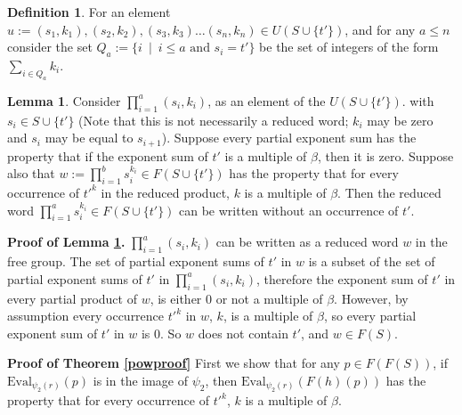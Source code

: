 \documentclass[12pt]{article} %
\theoremstyle{definition}
\theoremstyle{definition}
\theoremstyle{definition}
\theoremstyle{definition}
\newtheorem{sublemma}{Lemma}[theorem]
\theoremstyle{definition}
\newtheorem{defn}[theorem]{Definition}
\theoremstyle{definition}
\begin{document}
\begin{defn}
  For an element $u := (s_1, k_1), (s_2, k_2), (s_3, k_3) \dots (s_n, k_n) \in U(S \cup \{t'\})$,
  and for any $a \le n$
  consider the set $Q_a := \{ i \ \mid \ i \le a \text{ and } s_i = t' \}$
  be the set of integers of the form $\sum_{i \in Q_a} k_i$.
\end{defn}

\begin{sublemma}\label{powproof1}
  Consider $\prod_{i = 1}^a (s_i, k_i)$, as an element of the $U(S \cup \{t' \})$.
  with $s_i \in S \cup \{t'\}$ (Note that this is not necessarily a reduced
  word; $k_i$ may be zero and $s_i$ may be equal to $s_{i+1}$).
  Suppose every partial exponent sum has the property that if the exponent sum of
  $t'$ is a multiple of $\beta$, then it is zero. Suppose also that
  $w := \prod_{i = 1}^b s_i^{k_i} \in F(S \cup \{t'\})$ has the
  property that for every occurrence of $t'^k$ in the reduced product,
  $k$ is a multiple of $\beta$. Then the reduced word
  $\prod_{i = 1}^a s_i^{k_i} \in F(S \cup \{t'\})$
  can be written without an occurrence of $t'$.
\end{sublemma}

\textbf{Proof of Lemma \ref{powproof1}.}
$\prod_{i = 1}^a (s_i, k_i)$ can be written as a reduced word $w$ in the free group.
The set of partial exponent sums of $t'$ in $w$
is a subset of the set of partial exponent sums of $t'$ in $\prod_{i = 1}^a (s_i, k_i)$,
therefore the exponent sum of $t'$ in every partial product of $w$, is
either $0$ or not a multiple of $\beta$.
However, by assumption every occurrence $t'^k$ in $w$, $k$,
is a multiple of $\beta$, so every partial exponent sum of $t'$ in $w$ is $0$.
So $w$ does not contain $t'$, and $w \in F(S)$.



\textbf{Proof of Theorem \ref{powproof}} \newline
First we show that for any $p \in F(F(S))$,
if $\text{Eval}_{\psi_2(r)}(p)$ is in the image of $\psi_2$, then
$\text{Eval}_{\psi_2(r)}(F(h)(p))$ has the property
that for every occurrence of $t'^k$, $k$ is a multiple of $\beta$.
\end{document}
